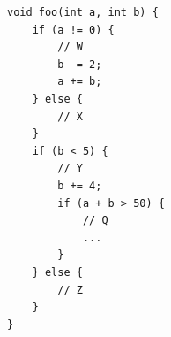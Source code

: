 \documentclass[tikz]{standalone}
\begin{document}
\begin{lrbox}{\coverageCode}
\begin{lstlisting}
void foo(int a, int b) {
    if (a != 0) {
        // W
        b -= 2;
        a += b;
    } else {
        // X
    }
    if (b < 5) {
        // Y
        b += 4;
        if (a + b > 50) {
            // Q
            ...
        }
    } else {
        // Z
    }
}
\end{lstlisting}
\end{lrbox}





\end{document}
